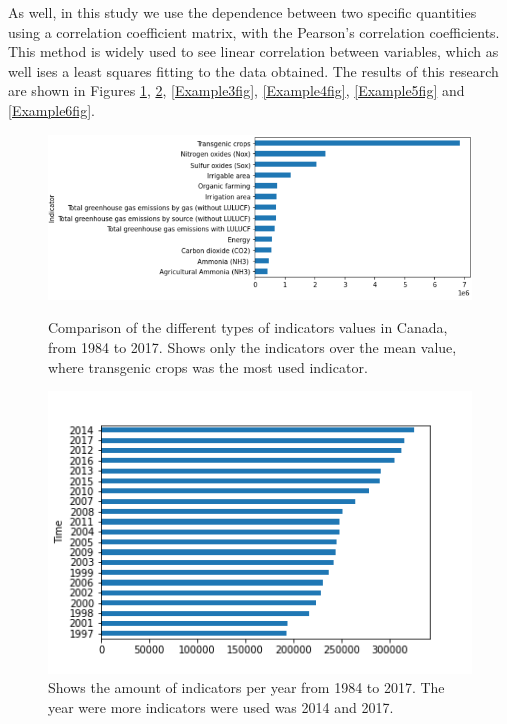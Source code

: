 \documentclass[11pt]{article}
\numberwithin{equation}{section}
\begin{document}
 As well, in this study we use the dependence between two specific quantities using  a correlation coefficient matrix, with  the Pearson's correlation coefficients. This method is widely used to see linear correlation between variables,  which as well ises  a least squares fitting to the data obtained.
 The results of this research are shown in Figures \ref{Example1fig}, \ref{Example2fig}, \ref{Example3fig}, \ref{Example4fig}, \ref{Example5fig}  and \ref{Example6fig}.
\begin{figure}[t]
\centering
\includegraphics[width=0.50\paperwidth, clip=true, trim=0mm 0mm 0mm 0mm]{figures/Indicator_Value}\\

\caption{ Comparison of the different types of indicators  values in Canada, from 1984 to 2017. Shows only the indicators over the mean value, where transgenic crops was the most used indicator.
}
\label{Example1fig}
\end{figure}
\begin{figure}[t]
\centering
\includegraphics[width=0.30\paperwidth, clip=true, trim=0mm 0mm 0mm 0mm]{figures/Time_Value}\qquad

\caption{Shows  the amount of indicators per year from 1984 to 2017. The year were more  indicators were used was 2014 and 2017.
}
\label{Example2fig}
\end{figure}
\end{document}
